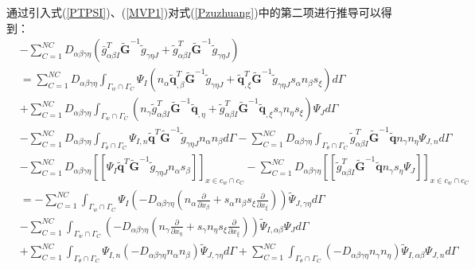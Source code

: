 \newpage
通过引入式(\ref{PTPSI})、(\ref{MVP1})对式(\ref{Pzuzhuang})中的第二项进行推导可以得到：
\begin{equation}
\begin{split}
    &-\sum_{C=1}^{N\!C}D_{\alpha\beta\gamma\eta}(\bar{g}_{\alpha\beta I}^T\tilde{\pmb G}^{-1}\tilde{g}_{\gamma\eta J}+\tilde{g}_{\alpha\beta I}^T\tilde{\pmb G}^{-1}\tilde{g}_{\gamma\eta J})\\
    &=\sum_{C=1}^{N\!C}D_{\alpha\beta\gamma\eta}\int_{{\Gamma_w}\cap{\Gamma_C}}\Psi_I(n_{\alpha}
    \tilde{\pmb q}_{,\beta}^T\tilde{\pmb G}^{-1}\tilde{g}_{\gamma\eta J}+\tilde{\pmb q}_{,\xi}^T\tilde{\pmb G}^{-1}\tilde{g}_{\gamma\eta J}s_{\alpha}n_{\beta}s_{\xi})d\Gamma\\
    &+\sum_{C=1}^{N\!C}D_{\alpha\beta\gamma\eta}\int_{{\Gamma_w}\cap{\Gamma_C}}(n_{\gamma}
    \tilde{g}_{\alpha\beta I}^T\tilde{\pmb G}^{-1}\tilde{\pmb q}_{,\eta}+\tilde{g}_{\alpha\beta I}^T
    \tilde{\pmb G}^{-1}\tilde{\pmb q}_{,\xi}s_{\gamma}n_{\eta}s_{\xi})\Psi_Jd\Gamma\\
    &-\sum_{C=1}^{N\!C}D_{\alpha\beta\gamma\eta}\int_{{\Gamma_{\theta}}\cap{\Gamma_C}}\Psi_{I,n}
    \tilde{\pmb q}^T\tilde{\pmb G}^{-1}\tilde{g}_{\gamma\eta J}n_{\alpha}n_{\beta}d\Gamma
    -\sum_{C=1}^{N\!C}D_{\alpha\beta\gamma\eta}\int_{{\Gamma_{\theta}}\cap{\Gamma_C}}
    \tilde{g}_{\alpha\beta I}^T\tilde{\pmb G}^{-1}\tilde{\pmb q}n_{\gamma}n_{
    \eta}\Psi_{J,n}d\Gamma\\
    &-\sum_{C=1}^{N\!C}D_{\alpha\beta\gamma\eta}[[\Psi_I\tilde{\pmb q}^T\tilde{\pmb G}^{-1}\tilde{g}_{\gamma\eta J}n_{\alpha}s_{\beta}]]_{x\in{c_w}\cap{c_C}}
    -\sum_{C=1}^{N\!C}D_{\alpha\beta\gamma\eta}[[\tilde{g}_{\alpha\beta I}^T\tilde{\pmb G}^{-1}\tilde{\pmb q}n_{\gamma}s_{\eta}\Psi_J]]_{x\in{c_w}\cap{c_C}}\\
    &=-\sum_{C=1}^{N\!C}\int_{{\Gamma_w}\cap{\Gamma_C}}\Psi_I(-D_{\alpha\beta\gamma\eta}(n_{\alpha}\frac{\partial}{\partial x_{\beta}}+s_{\alpha}n_{\beta}s_{\xi}\frac{\partial}{\partial x_{\xi}}))\tilde{\Psi}_{J,\gamma\eta}d\Gamma\\
    &-\sum_{C=1}^{N\!C}\int_{{\Gamma_w}\cap{\Gamma_C}}(-D_{\alpha\beta\gamma\eta}(n_{\gamma}\frac{\partial}{\partial x_{\eta}}+s_{\gamma}n_{\eta}s_{\xi}\frac{\partial}{\partial x_{\xi}}))\tilde{\Psi}_{I,\alpha\beta}\Psi_Jd\Gamma\\
    &+\sum_{C=1}^{N\!C}\int_{{\Gamma_{\theta}}\cap{\Gamma_C}}\Psi_{I,n}(-D_{\alpha\beta\gamma\eta}n_{\alpha}n_{\beta})\tilde{\Psi}_{J,\gamma\eta}d\Gamma
    +\sum_{C=1}^{N\!C}\int_{{\Gamma_{\theta}}\cap{\Gamma_C}}(-D_{\alpha\beta\gamma\eta}n_{\gamma}n_{\eta})\tilde{\Psi}_{I,\alpha\beta}\Psi_{J,n}d\Gamma\\

\end{split}
\end{equation}
